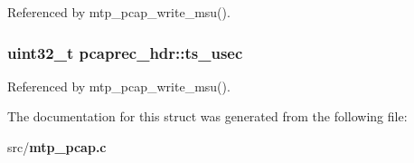 Referenced by mtp\+\_\+pcap\+\_\+write\+\_\+msu().

\subsubsection[{ts\+\_\+usec}]{\setlength{\rightskip}{0pt plus 5cm}uint32\+\_\+t pcaprec\+\_\+hdr\+::ts\+\_\+usec}\label{structpcaprec__hdr_aeb9936524b76c40c43074813cd966b75}


Referenced by mtp\+\_\+pcap\+\_\+write\+\_\+msu().



The documentation for this struct was generated from the following file\+:\begin{DoxyCompactItemize}
\item 
src/{\bf mtp\+\_\+pcap.\+c}\end{DoxyCompactItemize}
